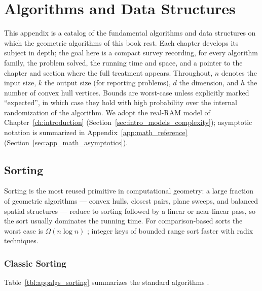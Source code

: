 \chapter{Algorithms and Data Structures}
\label{app:algorithms_structures}

This appendix is a catalog of the fundamental algorithms and data
structures on which the geometric algorithms of this book rest. Each
chapter develops its subject in depth; the goal here is a compact survey
recording, for every algorithm family, the problem solved, the running
time and space, and a pointer to the chapter and section where the full
treatment appears. Throughout, $n$ denotes the input size, $k$ the output
size (for reporting problems), $d$ the dimension, and $h$ the number of
convex hull vertices. Bounds are worst-case unless explicitly marked
``expected'', in which case they hold with high probability over the
internal randomization of the algorithm. We adopt the real-RAM model of
Chapter~\ref{ch:introduction} (Section~\ref{sec:intro_models_complexity});
asymptotic notation is summarized in Appendix~\ref{app:math_reference}
(Section~\ref{sec:app_math_asymptotics}).

\section{Sorting}
\label{sec:app_alg_sorting}

Sorting is the most reused primitive in computational geometry: a large
fraction of geometric algorithms --- convex hulls, closest pairs, plane
sweeps, and balanced spatial structures --- reduce to sorting followed by
a linear or near-linear pass, so the sort usually dominates the running
time. For comparison-based sorts the worst case is $\Omega(n\log n)$
\cite{cormen2009}; integer keys of bounded range sort faster with radix
techniques.

\subsection{Classic Sorting}
\label{sec:appalgs_sorting_classic}

Table~\ref{tbl:appalgs_sorting} summarizes the standard algorithms
\cite{cormen2009}.

